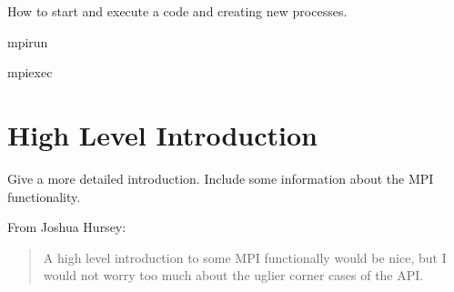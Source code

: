 \todo How to start and execute a code and creating new processes. 

mpirun

mpiexec

\section{High Level Introduction}

\todo Give a more detailed introduction. Include some information about the
MPI functionality. 

From Joshua Hursey: 
\begin{quote}
  A high level introduction to some MPI functionally would be nice,
  but I would not worry too much about the uglier corner cases of the
  API.
\end{quote}


